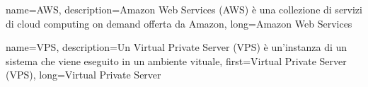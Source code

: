 {
    name={AWS},
    description={Amazon Web Services (AWS) è una collezione di servizi di cloud computing on demand offerta da Amazon},
    long={Amazon Web Services}
} 

{
    name={VPS},
    description={Un Virtual Private Server (VPS) è un'instanza di un sistema che viene eseguito in un ambiente vituale},
    first={Virtual Private Server (VPS)},
    long={Virtual Private Server}
}